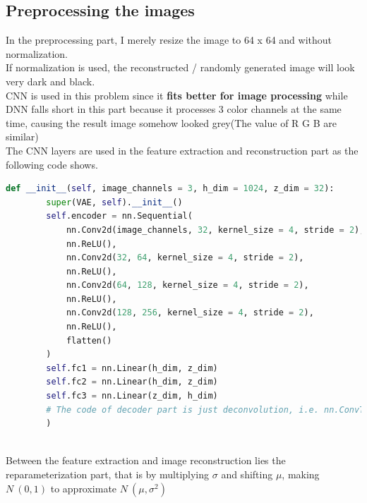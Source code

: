 \documentclass[11pt, a4paper]{article} %
\begin{document}
\subsection{Preprocessing the images} %
In the preprocessing part, I merely resize the image to 64 x 64 and without normalization. 
\\ If normalization is used, the reconstructed / randomly generated image will look very dark and black.
\\ CNN is used in this problem since it \textbf{fits better for image processing} while DNN falls short in this part because it processes 3 color channels at the same time, causing the result image somehow looked grey(The value of R G B are similar)
\\ The CNN layers are used in the feature extraction and reconstruction part as the following code shows.
\begin{lstlisting}[language = python]
def __init__(self, image_channels = 3, h_dim = 1024, z_dim = 32):
        super(VAE, self).__init__()
        self.encoder = nn.Sequential(
            nn.Conv2d(image_channels, 32, kernel_size = 4, stride = 2),
            nn.ReLU(),
            nn.Conv2d(32, 64, kernel_size = 4, stride = 2),
            nn.ReLU(),
            nn.Conv2d(64, 128, kernel_size = 4, stride = 2),
            nn.ReLU(),
            nn.Conv2d(128, 256, kernel_size = 4, stride = 2),
            nn.ReLU(),
            flatten()
        )
        self.fc1 = nn.Linear(h_dim, z_dim)
        self.fc2 = nn.Linear(h_dim, z_dim)
        self.fc3 = nn.Linear(z_dim, h_dim)
        # The code of decoder part is just deconvolution, i.e. nn.ConvTranspose2d with reverse order and I/O dimension
        )
\end{lstlisting}
\\ Between the feature extraction and image reconstruction lies the reparameterization part, that is by multiplying $\sigma$ and shifting $\mu$, making $N~(0, 1)$ to approximate $N~(\mu, \sigma^2)$
\end{document}
